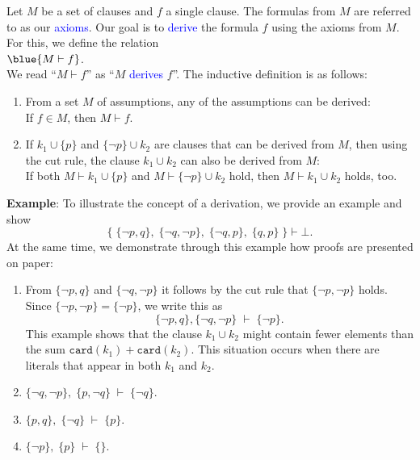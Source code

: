 \begin{Definition} \hspace*{\fill} \linebreak
    Let $M$ be a set of clauses and $f$ a single clause.  
    The formulas from $M$ are referred to as our \textcolor{blue}{axioms}. Our goal is to \textcolor{blue}{derive} the formula $f$ using the axioms from $M$.
    For this, we define the relation \\[0.2cm]
    \hspace*{1.3cm}
    $\blue{M \vdash f}$. \\[0.2cm]
    We read ``$M \vdash f$'' as ``$M$ \textcolor{blue}{derives} $f$''. The inductive definition is as follows:
    \begin{enumerate}
    \item From a set $M$ of assumptions, any of the assumptions can be derived: \\[0.2cm]
          \hspace*{0.3cm} 
          If \quad $f \in M$, \quad then \quad $M \vdash f$.
    \item If $k_1 \cup \{p\}$ and $\{ \neg p \} \cup k_2$ are clauses that can be derived from $M$,
          then using the cut rule, the clause $k_1 \cup k_2$ can also be derived from $M$: \\[0.2cm]
          \hspace*{0.3cm} 
          If both \quad $M \vdash k_1 \cup \{p\}$ \quad and \quad $M \vdash \{ \neg p \} \cup k_2$ \quad
          hold, then \quad $M \vdash k_1 \cup k_2$ \quad holds, too.
    \eox
    \end{enumerate}
\end{Definition}

\noindent
\textbf{Example}: To illustrate the concept of a derivation, we provide an example and
show
\[ \bigl\{\; \{\neg p, q\},\; \{ \neg q, \neg p \},\; \{ \neg q, p \},\; \{ q, p \}\; \bigr\} \vdash \bot.
\]
At the same time, we demonstrate through this example how proofs are presented on paper:
\begin{enumerate}
\item From $\{\neg p, q \}$ and $\{ \neg q, \neg p \}$ it follows by the cut rule that   
      $\{ \neg p, \neg p \}$ holds. Since $\{ \neg p, \neg p \} = \{ \neg p \}$,
      we write this as 
      \[ \{\neg p, q \}, \{ \neg q, \neg p \} \;\vdash\; \{ \neg p \}. \]
      \remarkEng
      This example shows that the clause $k_1 \cup k_2$ might contain fewer
      elements than the sum $\mathtt{card}(k_1) + \mathtt{card}(k_2)$. This
      situation occurs when there are literals that appear in both $k_1$ and $k_2$.
\item $\{\neg q, \neg p \},\; \{ p, \neg q \} \;\vdash\; \{ \neg q \}$. 
\item $\{ p, q \},\; \{ \neg q \} \;\vdash\; \{ p \}$. 
\item $\{ \neg p \},\; \{ p \} \;\vdash\; \{\}$. 
\end{enumerate}

